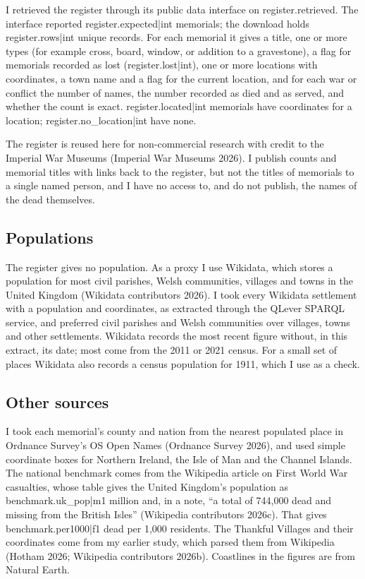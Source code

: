 \documentclass[11pt,a4paper]{article}
\begin{document}
I retrieved the register through its public data interface on {{register.retrieved}}. The interface reported {{register.expected|int}} memorials; the download holds {{register.rows|int}} unique records. For each memorial it gives a title, one or more types (for example cross, board, window, or addition to a gravestone), a flag for memorials recorded as lost ({{register.lost|int}}), one or more locations with coordinates, a town name and a flag for the current location, and for each war or conflict the number of names, the number recorded as died and as served, and whether the count is exact. {{register.located|int}} memorials have coordinates for a location; {{register.no_location|int}} have none.

The register is reused here for non-commercial research with credit to the Imperial War Museums (Imperial War Museums 2026). I publish counts and memorial titles with links back to the register, but not the titles of memorials to a single named person, and I have no access to, and do not publish, the names of the dead themselves.

\subsection{Populations}

The register gives no population. As a proxy I use Wikidata, which stores a population for most civil parishes, Welsh communities, villages and towns in the United Kingdom (Wikidata contributors 2026). I took every Wikidata settlement with a population and coordinates, as extracted through the QLever SPARQL service, and preferred civil parishes and Welsh communities over villages, towns and other settlements. Wikidata records the most recent figure without, in this extract, its date; most come from the 2011 or 2021 census. For a small set of places Wikidata also records a census population for 1911, which I use as a check.

\subsection{Other sources}

I took each memorial's county and nation from the nearest populated place in Ordnance Survey's OS Open Names (Ordnance Survey 2026), and used simple coordinate boxes for Northern Ireland, the Isle of Man and the Channel Islands. The national benchmark comes from the Wikipedia article on First World War casualties, whose table gives the United Kingdom's population as {{benchmark.uk_pop|m1}} million and, in a note, ``a total of 744,000 dead and missing from the British Isles'' (Wikipedia contributors 2026c). That gives {{benchmark.per1000|f1}} dead per 1,000 residents. The Thankful Villages and their coordinates come from my earlier study, which parsed them from Wikipedia (Hotham 2026; Wikipedia contributors 2026b). Coastlines in the figures are from Natural Earth.
\end{document}
